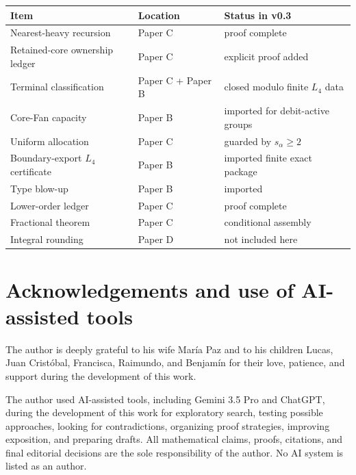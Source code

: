 \documentclass[11pt]{article}
\theoremstyle{definition}
\begin{document}
\begin{center}
\begin{tabular}{lll}
\toprule
Item & Location & Status in v0.3\\
\midrule
Nearest-heavy recursion & Paper C & proof complete\\
Retained-core ownership ledger & Paper C & explicit proof added\\
Terminal classification & Paper C + Paper B & closed modulo finite \(L_4\) data\\
Core-Fan capacity & Paper B & imported for debit-active groups\\
Uniform allocation & Paper C & guarded by \(s_\alpha\ge2\)\\
Boundary-export \(L_4\) certificate & Paper B & imported finite exact package\\
Type blow-up & Paper B & imported\\
Lower-order ledger & Paper C & proof complete\\
Fractional theorem & Paper C & conditional assembly\\
Integral rounding & Paper D & not included here\\
\bottomrule
\end{tabular}
\end{center}

\section*{Acknowledgements and use of AI-assisted tools}

The author is deeply grateful to his wife Mar\'ia Paz and to his children Lucas, Juan Crist\'obal, Francisca, Raimundo, and Benjam\'in for their love, patience, and support during the development of this work.

The author used AI-assisted tools, including Gemini 3.5 Pro and ChatGPT, during the development of this work for exploratory search, testing possible approaches, looking for contradictions, organizing proof strategies, improving exposition, and preparing drafts. All mathematical claims, proofs, citations, and final editorial decisions are the sole responsibility of the author. No AI system is listed as an author.
\end{document}
